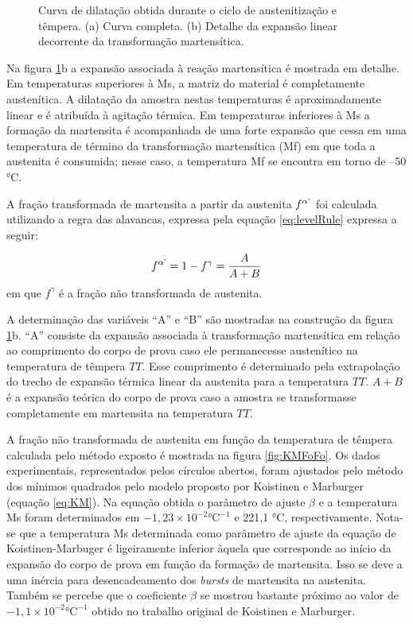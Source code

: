 \begin{figure}
	\vspace{0pt}
	\caption{Curva de dilatação obtida durante o ciclo de austenitização e têmpera. (a) Curva completa. (b) Detalhe da expansão linear decorrente da transformação martensítica.}
	\label{fig:dilMartensita}
\end{figure}

Na figura \ref{fig:dilMartensita}b a expansão associada à reação martensítica é mostrada em detalhe. Em temperaturas superiores à Ms, a matriz do material é completamente austenítica. A dilatação da amostra nestas temperaturas é aproximadamente linear e é atribuída à agitação térmica. Em temperaturas inferiores à Ms a formação da martensita é acompanhada de uma forte expansão que cessa em uma temperatura de término da transformação martensítica (Mf) em que toda a austenita é consumida; nesse caso, a temperatura Mf se encontra em torno de --50 °C.

A fração transformada de martensita a partir da austenita $f^{\alpha\text{\textquoteright}}$ foi calculada utilizando a regra das alavancas, expressa pela equação \ref{eq:levelRule} expressa a seguir:

\begin{equation}
	f^{\alpha\text{\textquoteright}} = 1 - f^\gamma = \frac{A}{A + B}
	\label{eq:levelRule}
\end{equation}
%
em que $f^\gamma$ é a fração não transformada de austenita.

A determinação das variáveis ``A'' e ``B'' são mostradas na construção da figura \ref{fig:dilMartensita}b. ``A'' consiste da expansão associada à transformação martensítica em relação ao comprimento do corpo de prova caso ele permanecesse austenítico na temperatura de têmpera $TT$. Esse comprimento é determinado pela extrapolação do trecho de expansão térmica linear da austenita para a temperatura $TT$. $A + B$ é a expansão teórica do corpo de prova caso a amostra se transformasse completamente em martensita na temperatura $TT$.

A fração não transformada de austenita em função da temperatura de têmpera calculada pelo método exposto é mostrada na figura \ref{fig:KMFoFo}. Os dados experimentais, representados pelos círculos abertos, foram ajustados pelo método dos mínimos quadrados pelo modelo proposto por Koistinen e Marburger (equação \ref{eq:KM}). Na equação obtida o parâmetro de ajuste $\beta$ e a temperatura Ms foram determinados em $-1,23 \times 10^{-2} \text{°C}^{-1}$ e 221,1 °C, respectivamente. Nota-se que a temperatura Ms determinada como parâmetro de ajuste da equação de Koistinen-Marbuger é ligeiramente inferior àquela que corresponde ao início da expansão do corpo de prova em função da formação de martensita. Isso se deve a uma inércia para desencadeamento dos \textit{bursts} de martensita na austenita. Também se percebe que o coeficiente $\beta$ se mostrou bastante próximo ao valor de $-1,1 \times 10^{-2} \text{°C}^{-1}$ obtido no trabalho original de Koistinen e Marburger\cite{Koistinen1959}.

